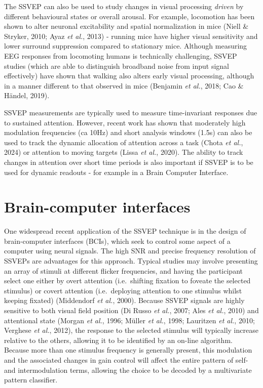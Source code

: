 \documentclass[
  letterpaper,
  DIV=11,
  numbers=noendperiod]{scrartcl}
\begin{document}
The SSVEP can also be used to study changes in visual processing
\textit{driven} by different behavioural states or overall arousal. For
example, locomotion has been shown to alter neuronal excitability and
spatial normalization in mice (Niell \& Stryker, 2010; Ayaz \emph{et
al.}, 2013) - running mice have higher visual sensitivity and lower
surround suppression compared to stationary mice. Although measuring EEG
responses from locomoting humans is technically challenging, SSVEP
studies (which are able to distinguish broadband noise from input signal
effectively) have shown that walking also alters early visual
processing, although in a manner different to that observed in mice
(Benjamin \emph{et al.}, 2018; Cao \& Händel, 2019).

SSVEP measurements are typically used to measure time-invariant
responses due to sustained attention. However, recent work has shown
that moderately high modulation frequencies (ca 10Hz) and short analysis
windows (1.5s) can also be used to track the dynamic allocation of
attention across a task (Chota \emph{et al.}, 2024) or attention to
moving targets (Lissa \emph{et al.}, 2020). The ability to track changes
in attention over short time periods is also important if SSVEP is to be
used for dynamic readouts - for example in a Brain Computer Interface.

\section{Brain-computer interfaces}\label{brain-computer-interfaces}

One widespread recent application of the SSVEP technique is in the
design of brain-computer interfaces (BCIs), which seek to control some
aspect of a computer using neural signals. The high SNR and precise
frequency resolution of SSVEPs are advantages for this approach. Typical
studies may involve presenting an array of stimuli at different flicker
frequencies, and having the participant select one either by overt
attention (i.e.~shifting fixation to foveate the selected stimulus) or
covert attention (i.e.~deploying attention to one stimulus whilst
keeping fixated) (Middendorf \emph{et al.}, 2000). Because SSVEP signals
are highly sensitive to both visual field position (Di Russo \emph{et
al.}, 2007; Ales \emph{et al.}, 2010) and attentional state (Morgan
\emph{et al.}, 1996; Müller \emph{et al.}, 1998; Lauritzen \emph{et
al.}, 2010; Verghese \emph{et al.}, 2012), the response to the selected
stimulus will typically increase relative to the others, allowing it to
be identified by an on-line algorithm. Because more than one stimulus
frequency is generally present, this modulation and the associated
changes in gain control will affect the entire pattern of self- and
intermodulation terms, allowing the choice to be decoded by a
multivariate pattern classifier.
\end{document}

